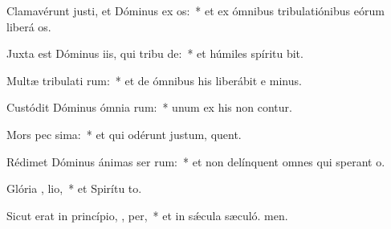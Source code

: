 \item Clamavérunt justi, et Dóminus ex os:~* et ex ómnibus tribulatiónibus eórum liberá os.
\item Juxta est Dóminus iis, qui tribu  de:~* et húmiles spíritu bit.
\item Multæ tribulati rum:~* et de ómnibus his liberábit e minus.
\item Custódit Dóminus ómnia  rum:~* unum ex his non contur.
\item Mors pec sima:~* et qui odérunt justum, quent.
\item Rédimet Dóminus ánimas ser rum:~* et non delínquent omnes qui sperant  o.
\item Glória ,  lio,~* et Spirítu to.
\item Sicut erat in princípio,  ,  per,~* et in sǽcula sæculó. men.
